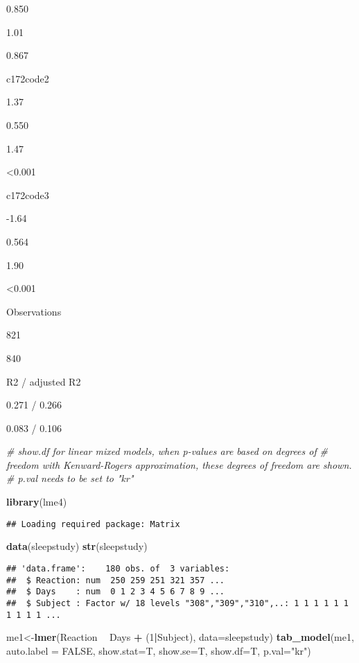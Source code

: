 \documentclass[]{article}
\newenvironment{Shaded}{\begin{snugshade}}{\end{snugshade}}
\newcommand{\KeywordTok}[1]{\textcolor[rgb]{0.13,0.29,0.53}{\textbf{#1}}}
\newcommand{\DataTypeTok}[1]{\textcolor[rgb]{0.13,0.29,0.53}{#1}}
\newcommand{\DecValTok}[1]{\textcolor[rgb]{0.00,0.00,0.81}{#1}}
\newcommand{\StringTok}[1]{\textcolor[rgb]{0.31,0.60,0.02}{#1}}
\newcommand{\CommentTok}[1]{\textcolor[rgb]{0.56,0.35,0.01}{\textit{#1}}}
\newcommand{\OtherTok}[1]{\textcolor[rgb]{0.56,0.35,0.01}{#1}}
\newcommand{\OperatorTok}[1]{\textcolor[rgb]{0.81,0.36,0.00}{\textbf{#1}}}
\newcommand{\NormalTok}[1]{#1}
\begin{document}
0.850

1.01

0.867

c172code2

1.37

0.550

1.47

\textless{}0.001

c172code3

-1.64

0.564

1.90

\textless{}0.001

Observations

821

840

R2 / adjusted R2

0.271 / 0.266

0.083 / 0.106

\begin{Shaded}
\begin{Highlighting}[]
\CommentTok{# show.df for linear mixed models, when p-values are based on degrees of}
\CommentTok{# freedom with Kenward-Rogers approximation, these degrees of freedom are shown.}
\CommentTok{# p.val needs to be set to "kr"}

\KeywordTok{library}\NormalTok{(lme4)}
\end{Highlighting}
\end{Shaded}

\begin{verbatim}
## Loading required package: Matrix
\end{verbatim}

\begin{Shaded}
\begin{Highlighting}[]
\KeywordTok{data}\NormalTok{(sleepstudy)}
\KeywordTok{str}\NormalTok{(sleepstudy)}
\end{Highlighting}
\end{Shaded}

\begin{verbatim}
## 'data.frame':    180 obs. of  3 variables:
##  $ Reaction: num  250 259 251 321 357 ...
##  $ Days    : num  0 1 2 3 4 5 6 7 8 9 ...
##  $ Subject : Factor w/ 18 levels "308","309","310",..: 1 1 1 1 1 1 1 1 1 1 ...
\end{verbatim}

\begin{Shaded}
\begin{Highlighting}[]
\NormalTok{me1<-}\KeywordTok{lmer}\NormalTok{(Reaction }\OperatorTok{~}\StringTok{ }\NormalTok{Days }\OperatorTok{+}\StringTok{ }\NormalTok{(}\DecValTok{1}\OperatorTok{|}\NormalTok{Subject), }\DataTypeTok{data=}\NormalTok{sleepstudy)}
\KeywordTok{tab_model}\NormalTok{(me1, }\DataTypeTok{auto.label =} \OtherTok{FALSE}\NormalTok{, }\DataTypeTok{show.stat=}\NormalTok{T, }\DataTypeTok{show.se=}\NormalTok{T, }\DataTypeTok{show.df=}\NormalTok{T, }
          \DataTypeTok{p.val=}\StringTok{"kr"}\NormalTok{)}
\end{Highlighting}
\end{Shaded}
\end{document}
